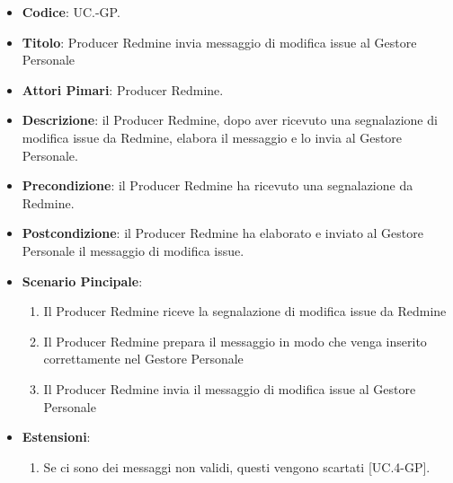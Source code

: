 		\begin{itemize}
			\item \textbf{Codice}: UC\theuccount.\thesubuccount-GP.
			\item \textbf{Titolo}: Producer Redmine invia messaggio di modifica issue al Gestore Personale
			\item \textbf{Attori Pimari}: Producer Redmine.
			\item \textbf{Descrizione}: il Producer Redmine, dopo aver ricevuto una segnalazione di modifica issue da Redmine, elabora il messaggio e lo invia al Gestore Personale.
			\item \textbf{Precondizione}: il Producer Redmine ha ricevuto una segnalazione da Redmine.
			\item \textbf{Postcondizione}: il Producer Redmine ha elaborato e inviato al Gestore Personale il messaggio di modifica issue.
			\item \textbf{Scenario Pincipale}: 
			\begin{enumerate}
				\item Il Producer Redmine riceve la segnalazione di modifica issue da Redmine
				\item Il Producer Redmine prepara il messaggio in modo che venga inserito correttamente nel Gestore Personale
				\item Il Producer Redmine invia il messaggio di	modifica issue al Gestore Personale
			\end{enumerate}
			\item \textbf{Estensioni}: 
			\begin{enumerate}
				\item Se ci sono dei messaggi non validi, questi vengono scartati [UC\theuccount.4-GP].
			\end{enumerate}
		\end{itemize}
	
